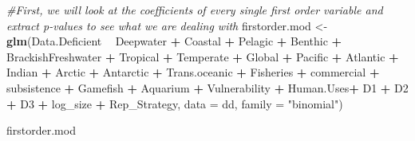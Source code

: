 \documentclass[]{article}
\newenvironment{Shaded}{\begin{snugshade}}{\end{snugshade}}
\newcommand{\KeywordTok}[1]{\textcolor[rgb]{0.13,0.29,0.53}{\textbf{#1}}}
\newcommand{\DataTypeTok}[1]{\textcolor[rgb]{0.13,0.29,0.53}{#1}}
\newcommand{\StringTok}[1]{\textcolor[rgb]{0.31,0.60,0.02}{#1}}
\newcommand{\CommentTok}[1]{\textcolor[rgb]{0.56,0.35,0.01}{\textit{#1}}}
\newcommand{\OperatorTok}[1]{\textcolor[rgb]{0.81,0.36,0.00}{\textbf{#1}}}
\newcommand{\NormalTok}[1]{#1}
\begin{document}
\begin{Shaded}
\begin{Highlighting}[]
\CommentTok{#First, we will look at the coefficients of every single first order variable and extract p-values to see what we are dealing with}
\NormalTok{firstorder.mod <-}\StringTok{ }\KeywordTok{glm}\NormalTok{(Data.Deficient }\OperatorTok{~}\StringTok{ }\NormalTok{Deepwater }\OperatorTok{+}\StringTok{ }\NormalTok{Coastal }\OperatorTok{+}\StringTok{ }\NormalTok{Pelagic }\OperatorTok{+}\StringTok{ }\NormalTok{Benthic }\OperatorTok{+}\StringTok{ }\NormalTok{BrackishFreshwater }\OperatorTok{+}
\StringTok{      }\NormalTok{Tropical }\OperatorTok{+}\StringTok{ }\NormalTok{Temperate }\OperatorTok{+}\StringTok{ }
\StringTok{      }\NormalTok{Global }\OperatorTok{+}\StringTok{ }\NormalTok{Pacific }\OperatorTok{+}\StringTok{ }\NormalTok{Atlantic }\OperatorTok{+}\StringTok{ }\NormalTok{Indian }\OperatorTok{+}\StringTok{ }\NormalTok{Arctic }\OperatorTok{+}\StringTok{ }\NormalTok{Antarctic }\OperatorTok{+}\StringTok{ }\NormalTok{Trans.oceanic }\OperatorTok{+}
\StringTok{      }\NormalTok{Fisheries }\OperatorTok{+}\StringTok{ }\NormalTok{commercial }\OperatorTok{+}\StringTok{ }\NormalTok{subsistence }\OperatorTok{+}\StringTok{ }\NormalTok{Gamefish }\OperatorTok{+}\StringTok{ }\NormalTok{Aquarium }\OperatorTok{+}\StringTok{ }\NormalTok{Vulnerability }\OperatorTok{+}\StringTok{ }\NormalTok{Human.Uses}\OperatorTok{+}\StringTok{ }\NormalTok{D1 }\OperatorTok{+}\StringTok{ }\NormalTok{D2 }\OperatorTok{+}\StringTok{ }\NormalTok{D3 }\OperatorTok{+}
\StringTok{      }\NormalTok{log_size }\OperatorTok{+}\StringTok{ }\NormalTok{Rep_Strategy, }\DataTypeTok{data =}\NormalTok{ dd, }\DataTypeTok{family =} \StringTok{"binomial"}\NormalTok{)}

\NormalTok{firstorder.mod }
\end{Highlighting}
\end{Shaded}
\end{document}

